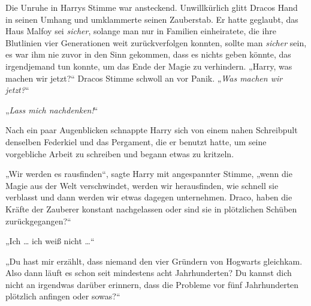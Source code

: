Die Unruhe in Harrys Stimme war ansteckend. Unwillkürlich glitt Dracos Hand in seinen Umhang und umklammerte seinen Zauberstab. Er hatte geglaubt, das Haus Malfoy sei \emph{sicher}, solange man nur in Familien einheiratete, die ihre Blutlinien vier Generationen weit zurückverfolgen konnten, sollte man \emph{sicher} sein, es war ihm nie zuvor in den Sinn gekommen, dass es nichts geben könnte, das irgendjemand tun konnte, um das Ende der Magie zu verhindern.
„Harry, was machen wir jetzt?“ Dracos Stimme schwoll an vor Panik.
„\emph{Was machen wir jetzt?}“

„\emph{Lass mich nachdenken!}“

Nach ein paar Augenblicken schnappte Harry sich von einem nahen Schreibpult denselben Federkiel und das Pergament, die er benutzt hatte, um seine vorgebliche Arbeit zu schreiben und begann etwas zu kritzeln.

„Wir werden es rausfinden“, sagte Harry mit angespannter Stimme, „wenn die Magie aus der Welt verschwindet, werden wir herausfinden, wie schnell sie verblasst und dann werden wir etwas dagegen unternehmen. Draco, haben die Kräfte der Zauberer konstant nachgelassen oder sind sie in plötzlichen Schüben zurückgegangen?“

„Ich … ich weiß nicht …“

„Du hast mir erzählt, dass niemand den vier Gründern von Hogwarts gleichkam. Also dann läuft es schon seit mindestens acht Jahrhunderten? Du kannst dich nicht an irgendwas darüber erinnern, dass die Probleme vor fünf Jahrhunderten plötzlich anfingen oder sowas?“

